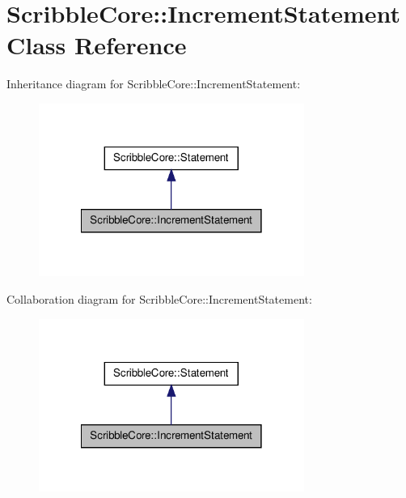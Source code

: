 \hypertarget{class_scribble_core_1_1_increment_statement}{\section{Scribble\-Core\-:\-:Increment\-Statement Class Reference}
\label{class_scribble_core_1_1_increment_statement}
}


Inheritance diagram for Scribble\-Core\-:\-:Increment\-Statement\-:\nopagebreak
\begin{figure}[H]
\begin{center}
\leavevmode
\includegraphics[width=246pt]{class_scribble_core_1_1_increment_statement__inherit__graph}
\end{center}
\end{figure}


Collaboration diagram for Scribble\-Core\-:\-:Increment\-Statement\-:\nopagebreak
\begin{figure}[H]
\begin{center}
\leavevmode
\includegraphics[width=246pt]{class_scribble_core_1_1_increment_statement__coll__graph}
\end{center}
\end{figure}
